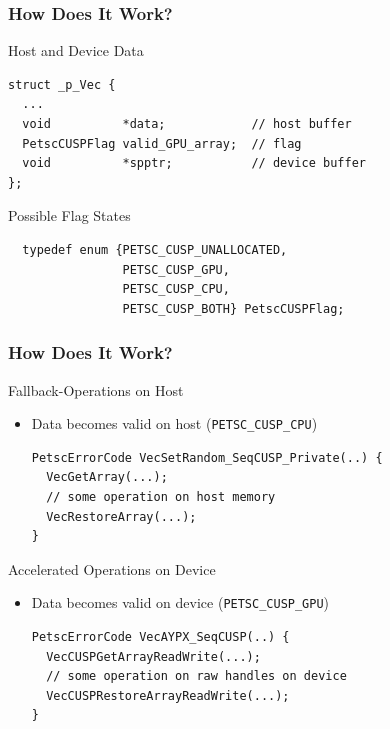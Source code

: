 \begin{frame}[fragile]
\frametitle{How Does It Work?}
  \begin{block}{Host and Device Data}
  \begin{lstlisting}
struct _p_Vec {
  ...
  void          *data;            // host buffer
  PetscCUSPFlag valid_GPU_array;  // flag
  void          *spptr;           // device buffer
};
  \end{lstlisting}
  \end{block}

  \begin{block}{Possible Flag States}
  \begin{lstlisting}
  typedef enum {PETSC_CUSP_UNALLOCATED,
                PETSC_CUSP_GPU,
                PETSC_CUSP_CPU,
                PETSC_CUSP_BOTH} PetscCUSPFlag;
  \end{lstlisting}
  \end{block}

\end{frame}

\begin{frame}[fragile]
\frametitle{How Does It Work?}

  \begin{block}{Fallback-Operations on Host}
   \begin{itemize}
    \item Data becomes valid on host (\lstinline|PETSC_CUSP_CPU|)
      \begin{lstlisting}
PetscErrorCode VecSetRandom_SeqCUSP_Private(..) {
  VecGetArray(...);
  // some operation on host memory
  VecRestoreArray(...);
}
      \end{lstlisting}
   \end{itemize}
  \end{block}

  
  \begin{block}{Accelerated Operations on Device}
   \begin{itemize}
    \item Data becomes valid on device (\lstinline|PETSC_CUSP_GPU|)
      \begin{lstlisting}
PetscErrorCode VecAYPX_SeqCUSP(..) {
  VecCUSPGetArrayReadWrite(...);
  // some operation on raw handles on device
  VecCUSPRestoreArrayReadWrite(...);
}
      \end{lstlisting}
   \end{itemize}
  \end{block}

\end{frame}



